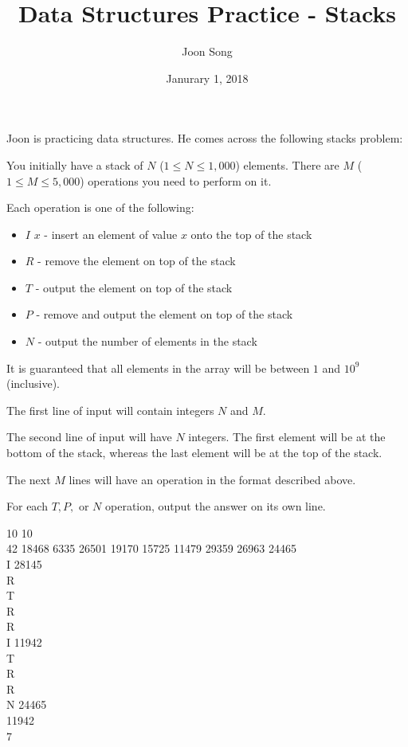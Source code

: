 \documentclass{problem-set}
\title{Data Structures Practice - Stacks}
\date{Janurary 1, 2018}
\author{Joon Song}
\begin{document}
\maketitle

Joon is practicing data structures. He comes across the following stacks problem:

You initially have a stack of $N$ ($1 \leq N \leq 1,000$) elements. There are $M$ ($1 \leq M \leq 5,000$) operations you need to perform on it.

Each operation is one of the following:
\begin{itemize}
    \item $I$ $x$ - insert an element of value $x$ onto the top of the stack
    \item $R$ - remove the element on top of the stack
    \item $T$ - output the element on top of the stack
    \item $P$ - remove and output the element on top of the stack
    \item $N$ - output the number of elements in the stack
\end{itemize}

It is guaranteed that all elements in the array will be between $1$ and $10^9$ (inclusive).

The first line of input will contain integers $N$ and $M$.

The second line of input will have $N$ integers. The first element will be at the bottom of the stack, whereas the last element will be at the top of the stack.

The next $M$ lines will have an operation in the format described above.

\outputformat
For each $T, P,$ or $N$ operation, output the answer on its own line.

\newpage

\addsample
{
    10 10 \\
    42 18468 6335 26501 19170 15725 11479 29359 26963 24465 \\
    I 28145 \\
    R \\
    T \\
    R \\
    R \\
    I 11942 \\
    T \\
    R \\
    R \\
    N 
}
{
    24465 \\
    11942 \\
    7
}
\end{document}
